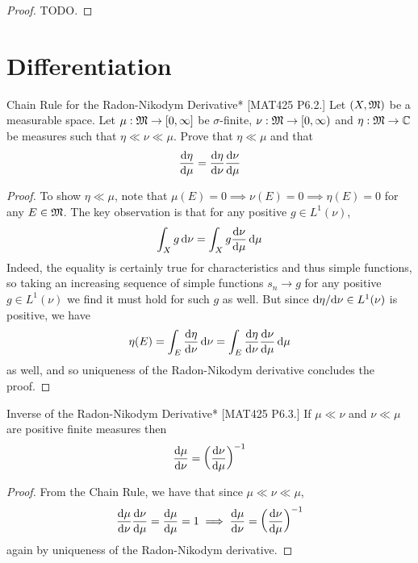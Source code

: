 \begin{proof}
    TODO. 
\end{proof}


\newpage
\section{Differentiation}

\begin{problem}{Chain Rule for the Radon-Nikodym Derivative}*
    [MAT425 P6.2.] Let \((X, \mathfrak{M})\) be a measurable space. Let \(\mu : \mathfrak{M} \to [0, \infty]\) be \(\sigma\)-finite, \(\nu : \mathfrak{M} \to [0, \infty)\) and \(\eta : \mathfrak{M} \to \mathbb{C}\) be measures such that \(\eta \ll \nu \ll \mu\). Prove that \(\eta \ll \mu\) and that 
    \[
        \frac{\mathrm{d}\eta}{\mathrm{d}\mu} = \frac{\mathrm{d}\eta}{\mathrm{d}\nu} \frac{\mathrm{d}\nu}{\mathrm{d}\mu}
    \]
\end{problem}

\begin{proof}
    To show \(\eta \ll \mu\), note that \(\mu(E) = 0 \implies \nu(E) = 0 \implies \eta(E) = 0\) for any \(E \in \mathfrak{M}\). The key observation is that for any positive \(g \in L^1(\nu)\), 
    \[
        \int_X g \, \mathrm{d}\nu = \int_X g \frac{\mathrm{d}\nu}{\mathrm{d}\mu} \, \mathrm{d}\mu
    \]
    Indeed, the equality is certainly true for characteristics and thus simple functions, so taking an increasing sequence of simple functions \(s_n \to g\) for any positive \(g \in L^1(\nu)\) we find it must hold for such \(g\) as well. But since \(\mathrm{d}\eta / \mathrm{d}\nu \in L^1(\nu)\) is positive, we have 
    \[
        \eta(E) = \int_E \frac{\mathrm{d}\eta}{\mathrm{d}\nu} \, \mathrm{d}\nu = \int_E \frac{\mathrm{d}\eta}{\mathrm{d}\nu} \frac{\mathrm{d}\nu}{\mathrm{d}\mu} \, \mathrm{d}\mu
    \]
    as well, and so uniqueness of the Radon-Nikodym derivative concludes the proof. 
\end{proof}

\begin{problem}{Inverse of the Radon-Nikodym Derivative}*
    [MAT425 P6.3.] If \(\mu \ll \nu\) and \(\nu \ll \mu\) are positive finite measures then 
    \[
        \frac{\mathrm{d}\mu}{\mathrm{d}\nu} = \left( \frac{\mathrm{d}\nu}{\mathrm{d}\mu} \right)^{-1}
    \]
\end{problem}

\begin{proof}
    From the Chain Rule, we have that since \(\mu \ll \nu \ll \mu\), 
    \[
        \frac{\mathrm{d}\mu}{\mathrm{d}\nu}\frac{\mathrm{d}\nu}{\mathrm{d}\mu} = \frac{\mathrm{d}\mu}{\mathrm{d}\mu} = 1
        \implies 
        \frac{\mathrm{d}\mu}{\mathrm{d}\nu} = \left( \frac{\mathrm{d}\nu}{\mathrm{d}\mu} \right)^{-1} 
    \]
    again by uniqueness of the Radon-Nikodym derivative. 
\end{proof}

